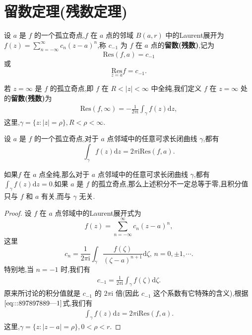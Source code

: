 \documentclass[../../main.tex]{subfiles}
\begin{document}
\section{留数定理(残数定理)}

\begin{definition}
设 \( a \) 是 \( f \) 的一个孤立奇点,\( f \) 在 \( a \) 点的邻域 \( B(a,r) \) 中的Laurent展开为 \( f(z) = \sum_{n = -\infty}^{\infty} c_n (z - a)^n \),称 \( c_{-1} \) 为 \( f \) 在 \( a \) 点的\textbf{留数(残数)},记为
\[
\mathrm{Res}(f,a) = c_{-1}
\]
或
\[
\underset{z = a}{\mathrm{Res}} f = c_{-1}.
\]

若 \( z = \infty \) 是 \( f \) 的孤立奇点,即 \( f \) 在 \( R < |z| < \infty \) 中全纯,我们定义 \( f \) 在 \( z = \infty \) 处的\textbf{留数(残数)}为
\begin{align}
\mathrm{Res}(f,\infty) = -\frac{1}{2\pi \mathrm{i}} \int_{\gamma} f(z) \mathrm{d}z, \label{eq:::897897889---3}
\end{align}
这里,\( \gamma = \{ z: |z| = \rho \}, R < \rho < \infty \).
\end{definition}

\begin{proposition}\label{proposition:积分与留数的关系}
设 \( a \) 是 \( f \) 的一个孤立奇点,对于 \( a \) 点邻域中的任意可求长闭曲线 \( \gamma \),都有$$\int_{\gamma} f(z) \mathrm{d}z = 2\pi \mathrm{i} \mathrm{Res}(f,a).$$
\end{proposition}
\begin{remark}
如果\( f \) 在 \( a \) 点全纯,那么对于 \( a \) 点邻域中的任意可求长闭曲线 \( \gamma \),都有 \( \int_{\gamma} f(z) \mathrm{d}z = 0 \).如果 \( a \) 是 \( f \) 的孤立奇点,那么上述积分不一定总等于零,且积分值只与 \( f \) 和 \( a \) 有关,而与 \( \gamma \) 无关.
\end{remark}
\begin{proof}
设 \( f \) 在 \( a \) 点邻域中的Laurent展开式为
\[
f(z) = \sum_{n = -\infty}^{\infty} c_n (z - a)^n,
\]
这里
\[
c_n = \frac{1}{2\pi \mathrm{i}} \int_{\gamma} \frac{f(\zeta)}{(\zeta - a)^{n + 1}} \mathrm{d}\zeta, \, n = 0, \pm 1, \cdots.
\]
特别地,当 \( n = -1 \) 时,我们有
\begin{align}
c_{-1} = \frac{1}{2\pi \mathrm{i}} \int_{\gamma} f(\zeta) \mathrm{d}\zeta. \label{eq:::897897889---1}
\end{align}
原来所讨论的积分值就是 \( c_{-1} \) 的 \( 2\pi \mathrm{i} \) 倍(因此 \( c_{-1} \) 这个系数有它特殊的含义),根据\(\eqref{eq:::897897889---1}\)式,我们有
\begin{align}
\int_{\gamma} f(z) \mathrm{d}z = 2\pi \mathrm{i} \mathrm{Res}(f,a). \label{eq:::897897889---2}
\end{align}
这里,\( \gamma = \{ z: |z - a| = \rho \}, 0 < \rho < r \).

\end{proof}
\end{document}
